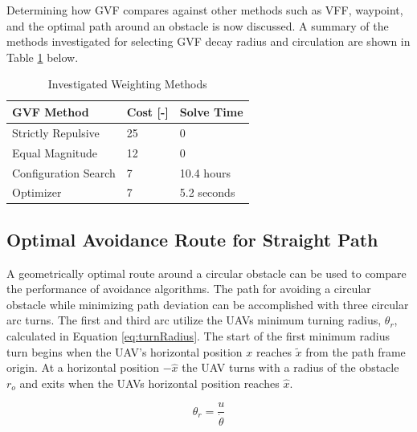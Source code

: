 \documentclass[numbered,pdftex]{ohio-etd}
\begin{document}
Determining how GVF compares against other methods such as VFF, waypoint, and the optimal path around an obstacle is now discussed. A summary of the methods investigated for selecting GVF decay radius and circulation are shown in Table \ref{table:gvfMethodTable} below.




\begin{table}[]
	\centering
	\caption{Investigated Weighting Methods}
	\label{table:gvfMethodTable}
	\begin{tabular}{|l|l|l|}
		\hline
		GVF Method           & Cost {[}-{]} & Solve Time  \\ \hline
		Strictly Repulsive   & 25           & 0           \\ \hline
		Equal Magnitude      & 12           & 0           \\ \hline
		Configuration Search & 7            & 10.4 hours  \\ \hline
		Optimizer            & 7            & 5.2 seconds \\ \hline
	\end{tabular}
\end{table}




\subsection{Optimal Avoidance Route for Straight Path}
A geometrically optimal route around a circular obstacle can be used to compare the performance of avoidance algorithms. The path for avoiding a circular obstacle while minimizing path deviation can be accomplished with three circular arc turns. The first and third arc utilize the UAVs minimum turning radius, $\theta_r$, calculated in Equation \ref{eq:turnRadius}. The start of the first minimum radius turn begins when the UAV's horizontal position $x$ reaches  $\tilde{x}$ from the path frame origin. At a horizontal position $-\hat{x}$ the UAV turns with a radius of the obstacle $r_o$ and exits when the UAVs horizontal position reaches $\hat{x}$. 

\begin{equation}
\label{eq:turnRadius}
\theta_r = \frac{u}{\dot{\theta}}
\end{equation}
\end{document}

